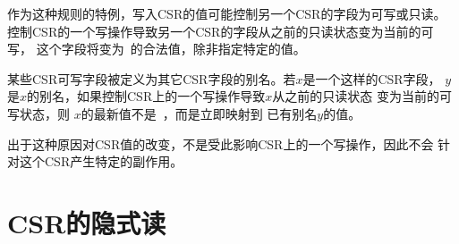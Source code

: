 \begin{commentary}

作为这种规则的特例，写入CSR的值可能控制另一个CSR的字段为可写或只读。
控制CSR的一个写操作导致另一个CSR的字段从之前的只读状态变为当前的可写，
这个字段将变为\unspecified\ 的合法值，除非指定特定的值。
\end{commentary}

\begin{commentary}

某些CSR可写字段被定义为其它CSR字段的别名。若$x$是一个这样的CSR字段，
 $y$是$x$的别名，如果控制CSR上的一个写操作导致$x$从之前的只读状态
 变为当前的可写状态，则 $x$的最新值不是\unspecified\ ，而是立即映射到
 已有别名$y$的值。
\end{commentary}


出于这种原因对CSR值的改变，不是受此影响CSR上的一个写操作，因此不会
针对这个CSR产生特定的副作用。

\section{CSR的隐式读
    }


